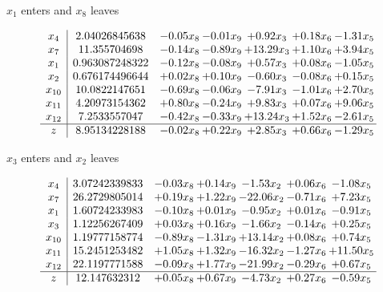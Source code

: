 \documentclass[8pt]{article}
\begin{document}
 $ x_{1} $ enters and $ x_{8} $ leaves 

 \[\begin{array}{c| c c@{\hskip 2pt} c@{\hskip 2pt} c@{\hskip 2pt} c@{\hskip 2pt} c@{\hskip 2pt} }
 x_{4}   &  2.04026845638 & -0.05 x_{8} & -0.01 x_{9} & +  0.92 x_{3} & +  0.18 x_{6} & -1.31 x_{5}\\
 x_{7}   &  11.355704698 & -0.14 x_{8} & -0.89 x_{9} & + 13.29 x_{3} & +  1.10 x_{6} & +  3.94 x_{5}\\
 x_{1}   &  0.963087248322 & -0.12 x_{8} & -0.08 x_{9} & +  0.57 x_{3} & +  0.08 x_{6} & -1.05 x_{5}\\
 x_{2}   &  0.676174496644 & +  0.02 x_{8} & +  0.10 x_{9} & -0.60 x_{3} & -0.08 x_{6} & +  0.15 x_{5}\\
 x_{10}   &  10.0822147651 & -0.69 x_{8} & -0.06 x_{9} & -7.91 x_{3} & -1.01 x_{6} & +  2.70 x_{5}\\
 x_{11}   &  4.20973154362 & +  0.80 x_{8} & -0.24 x_{9} & +  9.83 x_{3} & +  0.07 x_{6} & +  9.06 x_{5}\\
 x_{12}   &  7.2533557047 & -0.42 x_{8} & -0.33 x_{9} & + 13.24 x_{3} & +  1.52 x_{6} & -2.61 x_{5}\\
\hline
z    &  8.95134228188 & -0.02 x_{8} & +  0.22 x_{9} & +  2.85 x_{3} & +  0.66 x_{6} & -1.29 x_{5}\\
\end{array}\]


 $ x_{3} $ enters and $ x_{2} $ leaves 

 \[\begin{array}{c| c c@{\hskip 2pt} c@{\hskip 2pt} c@{\hskip 2pt} c@{\hskip 2pt} c@{\hskip 2pt} }
 x_{4}   &  3.07242339833 & -0.03 x_{8} & +  0.14 x_{9} & -1.53 x_{2} & +  0.06 x_{6} & -1.08 x_{5}\\
 x_{7}   &  26.2729805014 & +  0.19 x_{8} & +  1.22 x_{9} & -22.06 x_{2} & -0.71 x_{6} & +  7.23 x_{5}\\
 x_{1}   &  1.60724233983 & -0.10 x_{8} & +  0.01 x_{9} & -0.95 x_{2} & +  0.01 x_{6} & -0.91 x_{5}\\
 x_{3}   &  1.12256267409 & +  0.03 x_{8} & +  0.16 x_{9} & -1.66 x_{2} & -0.14 x_{6} & +  0.25 x_{5}\\
 x_{10}   &  1.19777158774 & -0.89 x_{8} & -1.31 x_{9} & + 13.14 x_{2} & +  0.08 x_{6} & +  0.74 x_{5}\\
 x_{11}   &  15.2451253482 & +  1.05 x_{8} & +  1.32 x_{9} & -16.32 x_{2} & -1.27 x_{6} & + 11.50 x_{5}\\
 x_{12}   &  22.1197771588 & -0.09 x_{8} & +  1.77 x_{9} & -21.99 x_{2} & -0.29 x_{6} & +  0.67 x_{5}\\
\hline
z    &  12.147632312 & +  0.05 x_{8} & +  0.67 x_{9} & -4.73 x_{2} & +  0.27 x_{6} & -0.59 x_{5}\\
\end{array}\]
\end{document}
